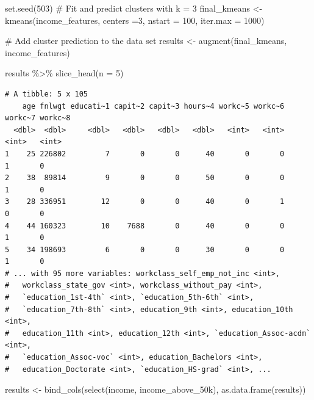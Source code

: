 \documentclass[
  letterpaper,
  DIV=11,
  numbers=noendperiod]{scrartcl}
\newenvironment{Shaded}{\begin{snugshade}}{\end{snugshade}}
\newcommand{\AttributeTok}[1]{\textcolor[rgb]{0.40,0.45,0.13}{#1}}
\newcommand{\CommentTok}[1]{\textcolor[rgb]{0.37,0.37,0.37}{#1}}
\newcommand{\DecValTok}[1]{\textcolor[rgb]{0.68,0.00,0.00}{#1}}
\newcommand{\FunctionTok}[1]{\textcolor[rgb]{0.28,0.35,0.67}{#1}}
\newcommand{\NormalTok}[1]{\textcolor[rgb]{0.00,0.23,0.31}{#1}}
\newcommand{\OtherTok}[1]{\textcolor[rgb]{0.00,0.23,0.31}{#1}}
\newcommand{\SpecialCharTok}[1]{\textcolor[rgb]{0.37,0.37,0.37}{#1}}
\begin{document}
\begin{Shaded}
\begin{Highlighting}[]
\FunctionTok{set.seed}\NormalTok{(}\DecValTok{503}\NormalTok{)}
\CommentTok{\# Fit and predict clusters with k = 3}
\NormalTok{final\_kmeans }\OtherTok{\textless{}{-}} \FunctionTok{kmeans}\NormalTok{(income\_features, }\AttributeTok{centers =}\DecValTok{3}\NormalTok{, }\AttributeTok{nstart =} \DecValTok{100}\NormalTok{, }\AttributeTok{iter.max =} \DecValTok{1000}\NormalTok{)}

\CommentTok{\# Add cluster prediction to the data set}
\NormalTok{results }\OtherTok{\textless{}{-}} \FunctionTok{augment}\NormalTok{(final\_kmeans, income\_features)}

\NormalTok{results }\SpecialCharTok{\%\textgreater{}\%} 
  \FunctionTok{slice\_head}\NormalTok{(}\AttributeTok{n =} \DecValTok{5}\NormalTok{)}
\end{Highlighting}
\end{Shaded}

\begin{verbatim}
# A tibble: 5 x 105
    age fnlwgt educati~1 capit~2 capit~3 hours~4 workc~5 workc~6 workc~7 workc~8
  <dbl>  <dbl>     <dbl>   <dbl>   <dbl>   <dbl>   <int>   <int>   <int>   <int>
1    25 226802         7       0       0      40       0       0       1       0
2    38  89814         9       0       0      50       0       0       1       0
3    28 336951        12       0       0      40       0       1       0       0
4    44 160323        10    7688       0      40       0       0       1       0
5    34 198693         6       0       0      30       0       0       1       0
# ... with 95 more variables: workclass_self_emp_not_inc <int>,
#   workclass_state_gov <int>, workclass_without_pay <int>,
#   `education_1st-4th` <int>, `education_5th-6th` <int>,
#   `education_7th-8th` <int>, education_9th <int>, education_10th <int>,
#   education_11th <int>, education_12th <int>, `education_Assoc-acdm` <int>,
#   `education_Assoc-voc` <int>, education_Bachelors <int>,
#   education_Doctorate <int>, `education_HS-grad` <int>, ...
\end{verbatim}

\begin{Shaded}
\begin{Highlighting}[]
\NormalTok{results }\OtherTok{\textless{}{-}} \FunctionTok{bind\_cols}\NormalTok{(}\FunctionTok{select}\NormalTok{(income, income\_above\_50k), }\FunctionTok{as.data.frame}\NormalTok{(results))}
\end{Highlighting}
\end{Shaded}
\end{document}
